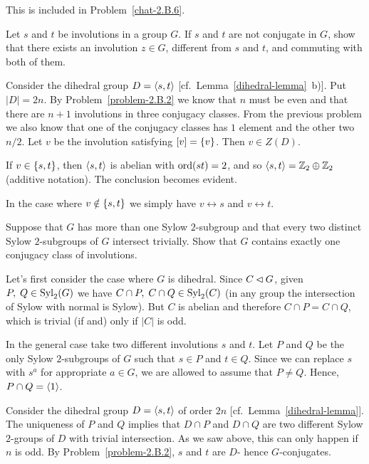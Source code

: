 \begin{solution} This is included in Problem~\ref{chat-2.B.6}.
\end{solution}

\begin{probl}
    Let\/ $s$ and\/ $t$ be involutions in a group\/ $G$. If\/ $s$ and\/ $t$ are not conjugate in\/ $G$, show that there exists an involution\/ $z\in G$, different from\/ $s$ and\/ $t$, and commuting with both of them.
\end{probl}

\begin{solution} Consider the dihedral group $D=\langle s,t\rangle$ [cf.~Lemma~\ref{dihedral-lemma}~b)]. Put $|D|=2n$. By Problem~\ref{problem-2.B.2} we know that $n$ must be even and that there are $n+1$ involutions in three conjugacy classes. From the previous problem we also know that one of the conjugacy classes has $1$ element and the other two $n/2$. Let $v$ be the involution satisfying $[v]=\{v\}$. Then $v\in Z(D)$.

If $v\in\{s,t\}$, then $\langle s,t\rangle$ is abelian with ${\rm ord}(st)=2$, and so $\langle s,t\rangle=\mathbb{Z}_2\oplus\mathbb{Z}_2$ (additive notation). The conclusion becomes evident.

In the case where $v\notin\{s,t\}$ we simply have $v\leftrightarrow s$ and $v\leftrightarrow t$.  \end{solution}

\begin{probl}
    Suppose that\/ $G$ has more than one Sylow\/ $2$-subgroup and that every two distinct Sylow\/ $2$-subgroups of\/ $G$ intersect trivially. Show that\/ $G$ contains exactly one conjugacy class of involutions.
\end{probl}

\begin{solution} Let's first consider the case where $G$ is dihedral. Since $C\lhd G$, given $P,\;Q\in{\rm Syl}_2(G)$ we have $C\cap P,\; C\cap Q\in{\rm Syl}_2(C)$ (in any group the intersection of Sylow with normal is Sylow). But $C$ is abelian and therefore $C\cap P=C\cap Q$, which is trivial (if and) only if $|C|$ is odd.

In the general case take two different involutions $s$ and $t$. Let $P$ and $Q$ be the only Sylow $2$-subgroups of $G$ such that $s\in P$ and $t\in Q$. Since we can replace $s$ with $s^a$ for appropriate $a\in G$, we are allowed to assume that $P\ne Q$. Hence, $P\cap Q=\langle1\rangle$. 

Consider the dihedral group $D=\langle s,t\rangle$ of order $2n$ [cf.~Lemma~\ref{dihedral-lemma}]. The uniqueness of $P$ and $Q$ implies that $D\cap P$ and $D\cap Q$ are two different Sylow $2$-groups of $D$ with trivial intersection. As we saw above, this can only happen if $n$ is odd. By Problem~\ref{problem-2.B.2}, $s$ and $t$ are $D$- hence $G$-conjugates.  \end{solution}

